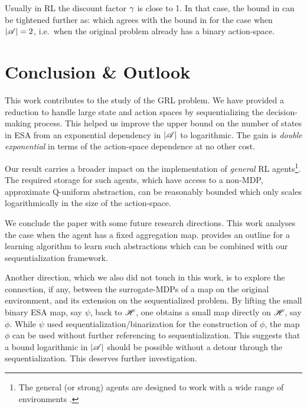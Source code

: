 \documentclass{article} %
\begin{document}
Usually in RL the discount factor $\gamma$ is close to 1. In that case, the bound in  can be tightened further as:
\beq
\abs{\S} \lesssim {}
\eeq
which agrees with the bound in  for the case when ${\left\lvert\mathscr{A}\right\rvert} = 2$, i.e.\ when the original problem already has a binary action-space.

\section{Conclusion \& Outlook}\label{sec:conclusion}
\vspace{-1.87mm}

This work contributes to the study of the GRL problem. We have provided a reduction to handle large state and action spaces by sequentializing the decision-making process.
This helped us improve the upper bound on the number of states in ESA from an exponential dependency in ${\left\lvert\mathscr{A}\right\rvert}$ to logarithmic. The gain is \emph{double exponential} in terms of the action-space dependence at no other cost.

Our result carries a broader impact on the implementation of \emph{general} RL agents\footnote{The general (or strong) agents are designed to work with a wide range of environments \cite{Hutter2000}.}. The required storage for such agents, which have access to a non-MDP, approximate Q-uniform abstraction, can be reasonably bounded which only scales logarithmically in the size of the action-space.

We conclude the paper with some future research directions. This work analyses the case when the agent has a fixed aggregation map. \citet{Hutter2016} provides an outline for a learning algorithm to learn such abstractions which can be combined with our sequentialization framework.

Another direction, which we also did not touch in this work, is to explore the connection, if any, between the surrogate-MDPs of a map on the original environment, and its extension on the sequentialized problem. By lifting the small binary ESA map, say $\psi$, back to $\mathscr{H}$, one obtains a small map directly on $\mathscr{H}$, say $\phi$. While $\psi$ used sequentialization/binarization for the construction of $\phi$, the map $\phi$ can be used without further referencing to sequentialization. This suggests that a bound logarithmic in ${\left\lvert\mathscr{A}\right\rvert}$ should be possible without a detour through the sequentialization. This deserves further investigation.
\end{document}
